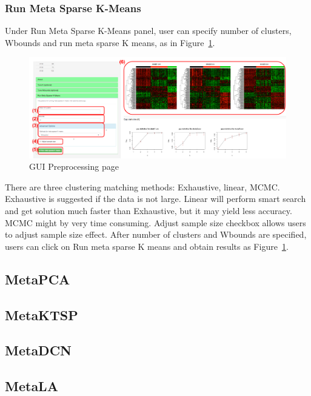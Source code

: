 \documentclass{article}
\begin{document}
\subsubsection{Run Meta Sparse K-Means}
Under Run Meta Sparse K-Means panel,
user can specify number of clusters, Wbounds and run meta sparse K means, 
as in Figure~\ref{fig:mskmRes}.
\begin{figure}[H]
\begin{center}
\includegraphics[scale=0.35]{./figure/metaClust/mskmRes}
\caption{GUI Preprocessing page}
\label{fig:mskmRes}
\end{center}
\end{figure}
There are three clustering matching methods: Exhaustive, linear, MCMC.
Exhaustive is suggested if the data is not large.
Linear will perform smart search and get solution much faster than Exhaustive, 
but it may yield less accuracy.
MCMC might by very time consuming.
Adjust sample size checkbox allows users to adjust sample size effect.
After number of clusters and Wbounds are specified,
users can click on Run meta sparse K means and obtain results as Figure~\ref{fig:mskmRes}.

\subsection{MetaPCA}

\subsection{MetaKTSP}

\subsection{MetaDCN}

\subsection{MetaLA}



 
\end{document}
